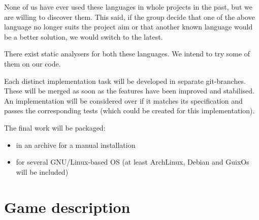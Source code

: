 \documentclass{article}
\begin{document}
None of us have ever used these languages in whole projects in the past, but we
are willing to discover them. This said, if the group decide that one of the
above language no longer suits the project aim or that another known language
would be a better solution, we would switch to the latest.
\medskip

There exist static analysers for both these languages. We intend to try some of
them on our code.
\medskip

Each distinct implementation task will be developed in separate git-branches.
These will be merged as soon as the features have been improved and stabilised.
An implementation will be considered over if it matches its specification and
passes the corresponding tests (which could be created for this implementation).
\bigskip

The final work will be packaged:
\begin{itemize}
	\item in an archive for a manual installation
	\item for several GNU/Linux-based OS
	(at least ArchLinux, Debian and GuixOs will be included)
\end{itemize}



\section{Game description}
\end{document}
